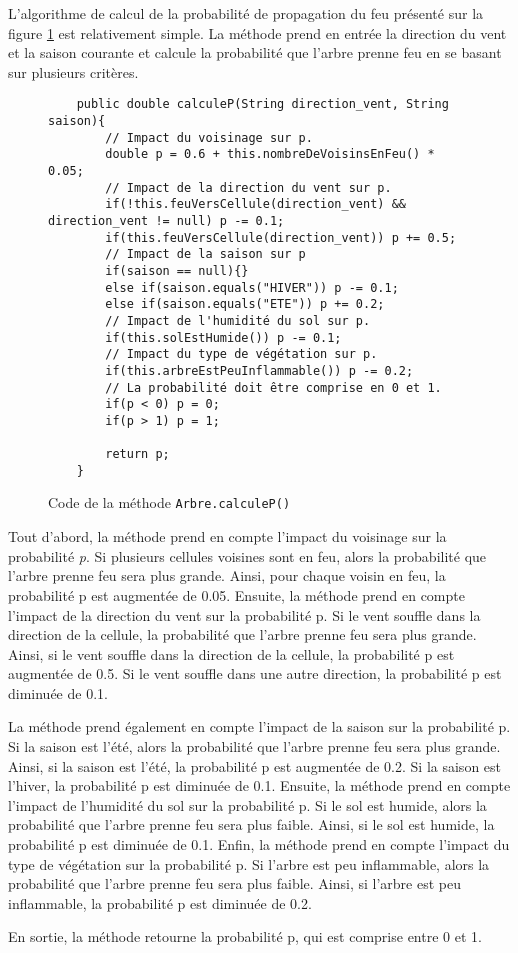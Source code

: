 L'algorithme de calcul de la probabilité de propagation du feu présenté sur la figure \ref{fig:calculProbaPropagation} est relativement simple. La méthode prend en entrée la direction du vent et la saison courante et calcule la probabilité que l'arbre prenne feu en se basant sur plusieurs critères.

\begin{figure}[htbp]
    \centering
    \begin{lstlisting}
    public double calculeP(String direction_vent, String saison){
        // Impact du voisinage sur p.
        double p = 0.6 + this.nombreDeVoisinsEnFeu() * 0.05;
        // Impact de la direction du vent sur p.
        if(!this.feuVersCellule(direction_vent) && direction_vent != null) p -= 0.1;
        if(this.feuVersCellule(direction_vent)) p += 0.5;
        // Impact de la saison sur p
        if(saison == null){}
        else if(saison.equals("HIVER")) p -= 0.1;
        else if(saison.equals("ETE")) p += 0.2;
        // Impact de l'humidité du sol sur p.
        if(this.solEstHumide()) p -= 0.1;
        // Impact du type de végétation sur p.
        if(this.arbreEstPeuInflammable()) p -= 0.2;
        // La probabilité doit être comprise en 0 et 1.
        if(p < 0) p = 0;
        if(p > 1) p = 1;
        
        return p;
    }
    \end{lstlisting}
    \caption{Code de la méthode \texttt{Arbre.calculeP()}}
    \label{fig:calculProbaPropagation}
\end{figure}

Tout d'abord, la méthode prend en compte l'impact du voisinage sur la probabilité \textit{p}. Si plusieurs cellules voisines sont en feu, alors la probabilité que l'arbre prenne feu sera plus grande. Ainsi, pour chaque voisin en feu, la probabilité p est augmentée de 0.05. Ensuite, la méthode prend en compte l'impact de la direction du vent sur la probabilité p. Si le vent souffle dans la direction de la cellule, la probabilité que l'arbre prenne feu sera plus grande. Ainsi, si le vent souffle dans la direction de la cellule, la probabilité p est augmentée de 0.5. Si le vent souffle dans une autre direction, la probabilité p est diminuée de 0.1.

La méthode prend également en compte l'impact de la saison sur la probabilité p. Si la saison est l'été, alors la probabilité que l'arbre prenne feu sera plus grande. Ainsi, si la saison est l'été, la probabilité p est augmentée de 0.2. Si la saison est l'hiver, la probabilité p est diminuée de 0.1. Ensuite, la méthode prend en compte l'impact de l'humidité du sol sur la probabilité p. Si le sol est humide, alors la probabilité que l'arbre prenne feu sera plus faible. Ainsi, si le sol est humide, la probabilité p est diminuée de 0.1. Enfin, la méthode prend en compte l'impact du type de végétation sur la probabilité p. Si l'arbre est peu inflammable, alors la probabilité que l'arbre prenne feu sera plus faible. Ainsi, si l'arbre est peu inflammable, la probabilité p est diminuée de 0.2.

En sortie, la méthode retourne la probabilité p, qui est comprise entre 0 et 1.